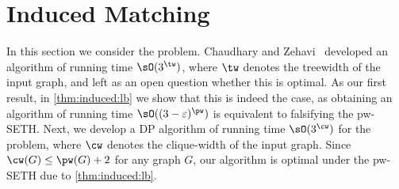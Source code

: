 \section{Induced Matching}\label{sec:induced}

In this section we consider the {\InducedM} problem.
Chaudhary and Zehavi~\cite{wg/ChaudharyZ23a} developed an algorithm of running time $\sO(3^\tw)$,
where $\tw$ denotes the treewidth of the input graph, and left as an open question whether this is optimal.
As our first result, in \cref{thm:induced:lb} we show that this is indeed the case,
as obtaining an algorithm of running time $\sO((3 - \varepsilon)^\pw)$ is equivalent to falsifying the pw-SETH.
Next, we develop a DP algorithm of running time $\sO(3^\cw)$ for the problem, where $\cw$ denotes the clique-width of the input graph.
Since $\cw(G) \le \pw(G) + 2$ for any graph $G$, our algorithm is optimal under the pw-SETH due to \cref{thm:induced:lb}.



